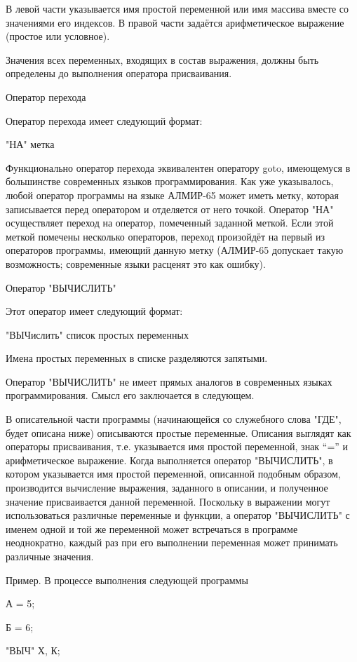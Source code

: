 \documentclass[11pt]{article}
\begin{document}
В левой части указывается имя простой
переменной или имя массива вместе со
значениями его индексов. В правой части
задаётся арифметическое выражение
(простое или условное).

Значения всех переменных, входящих в
состав выражения, должны быть
определены до выполнения оператора
присваивания.

Оператор перехода

Оператор перехода имеет следующий
формат:

"НА" метка

Функционально оператор перехода
эквивалентен оператору goto, имеющемуся
в большинстве современных языков
программирования. Как уже указывалось,
любой оператор программы на языке
АЛМИР-65 может иметь метку, которая
записывается перед оператором и
отделяется от него точкой. Оператор "НА"
осуществляет переход на оператор,
помеченный заданной меткой. Если этой
меткой помечены несколько операторов,
переход произойдёт на первый из
операторов программы, имеющий данную
метку (АЛМИР-65 допускает такую
возможность; современные языки
расценят это как ошибку).

Оператор "ВЫЧИСЛИТЬ"

Этот оператор имеет следующий формат:

"ВЫЧислить" список простых переменных

Имена простых переменных в списке
разделяются запятыми.

Оператор "ВЫЧИСЛИТЬ" не имеет прямых
аналогов в современных языках
программирования. Смысл его
заключается в следующем.

В описательной части программы
(начинающейся со служебного слова "ГДЕ",
будет описана ниже) описываются
простые переменные. Описания выглядят
как операторы присваивания, т.е.
указывается имя простой переменной,
знак “=” и арифметическое выражение.
Когда выполняется оператор "ВЫЧИСЛИТЬ",
в котором указывается имя простой
переменной, описанной подобным
образом, производится вычисление
выражения, заданного в описании, и
полученное значение присваивается
данной переменной. Поскольку в
выражении могут использоваться
различные переменные и функции, а
оператор "ВЫЧИСЛИТЬ" с именем одной и
той же переменной может встречаться в
программе неоднократно, каждый раз при
его выполнении переменная может
принимать различные значения.

Пример. В процессе выполнения
следующей программы

А = 5;

Б = 6;

"ВЫЧ" Х, К;
\end{document}
